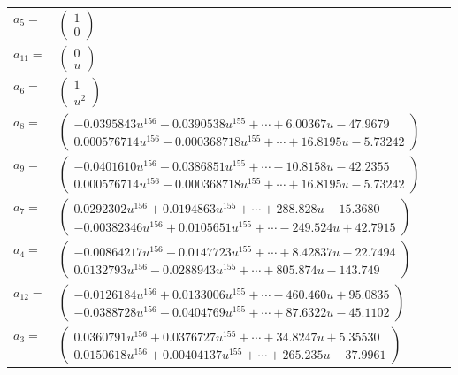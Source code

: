 \documentclass[1p]{elsarticle_modified}
\theoremstyle{definition}
\begin{document}
\begin{tabular}{m{7pt} m{180pt} m{7pt} m{180pt} }
\flushright $a_{5}=$&$\begin{pmatrix}1\\0\end{pmatrix}$ \\
\flushright $a_{11}=$&$\begin{pmatrix}0\\u\end{pmatrix}$ \\
\flushright $a_{6}=$&$\begin{pmatrix}1\\u^2\end{pmatrix}$ \\
\flushright $a_{8}=$&$\begin{pmatrix}-0.0395843 u^{156}-0.0390538 u^{155}+\cdots+6.00367 u-47.9679\\0.000576714 u^{156}-0.000368718 u^{155}+\cdots+16.8195 u-5.73242\end{pmatrix}$ \\
\flushright $a_{9}=$&$\begin{pmatrix}-0.0401610 u^{156}-0.0386851 u^{155}+\cdots-10.8158 u-42.2355\\0.000576714 u^{156}-0.000368718 u^{155}+\cdots+16.8195 u-5.73242\end{pmatrix}$ \\
\flushright $a_{7}=$&$\begin{pmatrix}0.0292302 u^{156}+0.0194863 u^{155}+\cdots+288.828 u-15.3680\\-0.00382346 u^{156}+0.0105651 u^{155}+\cdots-249.524 u+42.7915\end{pmatrix}$ \\
\flushright $a_{4}=$&$\begin{pmatrix}-0.00864217 u^{156}-0.0147723 u^{155}+\cdots+8.42837 u-22.7494\\0.0132793 u^{156}-0.0288943 u^{155}+\cdots+805.874 u-143.749\end{pmatrix}$ \\
\flushright $a_{12}=$&$\begin{pmatrix}-0.0126184 u^{156}+0.0133006 u^{155}+\cdots-460.460 u+95.0835\\-0.0388728 u^{156}-0.0404769 u^{155}+\cdots+87.6322 u-45.1102\end{pmatrix}$ \\
\flushright $a_{3}=$&$\begin{pmatrix}0.0360791 u^{156}+0.0376727 u^{155}+\cdots+34.8247 u+5.35530\\0.0150618 u^{156}+0.00404137 u^{155}+\cdots+265.235 u-37.9961\end{pmatrix}$ \\

\end{tabular}
\end{document}
